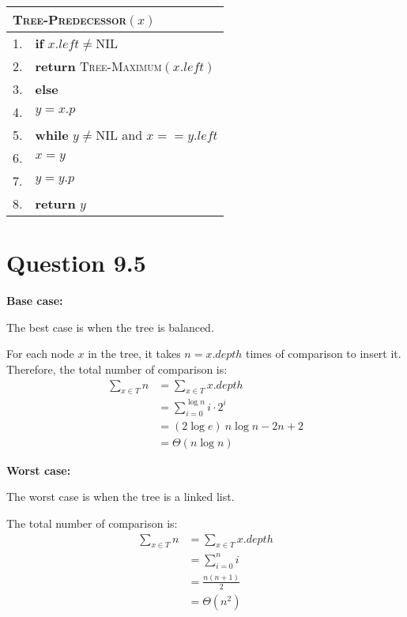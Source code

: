 \documentclass[a4paper,12pt]{article}
\begin{document}
\begin{center}
	\begin{tabular}{ll}
		\toprule
		\multicolumn{2}{l}{\textsc{Tree-Predecessor$(x)$}} \\
		\midrule
		1. & \textbf{if} $x.left \neq \text{NIL}$ \\
		2. & \qquad \textbf{return} \textsc{Tree-Maximum$(x.left)$} \\
		3. & \textbf{else} \\
		4. & \qquad $y = x.p$ \\
		5. & \qquad \textbf{while} $y \neq \text{NIL}$ and $x == y.left$ \\
		6. & \qquad \qquad $x = y$ \\
		7. & \qquad \qquad $y = y.p$ \\
		8. & \qquad \textbf{return} $y$ \\
		\bottomrule
	\end{tabular}
\end{center}

\section*{Question 9.5}

\textbf{Base case:}

The best case is when the tree is balanced.

For each node $x$ in the tree, it takes $n = x.depth$ times of comparison to insert it.
Therefore, the total number of comparison is:
\begin{align*}
	\sum_{x \in T} n &= \sum_{x \in T} x.depth \\
	&= \sum_{i = 0}^{\log n} i \cdot 2^i \\
	&= (2 \log e) \ n \log n - 2n + 2 \\
	&= \Theta(n \log n)
\end{align*}

\textbf{Worst case:}

The worst case is when the tree is a linked list.

The total number of comparison is:
\begin{align*}
	\sum_{x \in T} n &= \sum_{x \in T} x.depth \\
	&= \sum_{i = 0}^{n} i \\
	&= \frac{n(n+1)}{2} \\
	&= \Theta(n^2)
\end{align*}
\end{document}
